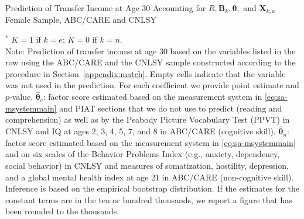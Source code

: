 \begin{table}
\begin{threeparttable}
\caption{Prediction of Transfer Income at Age 30 Accounting for $R, \bm{B}_k, \bm{\theta},$ and $\bm{X}_{k,a}$ Female Sample, ABC/CARE and CNLSY}
\label{table:end3}
\centering
\scriptsize

\begin{tablenotes}
\footnotesize
\item $^\ast$ $K=1$ if $k=e$; $K=0$ if $k=n$.\\ 
Note: Prediction of transfer income at age 30 based on the variables listed in the row using the ABC/CARE and the CNLSY sample constructed according to the procedure in Section~\ref{appendix:match}. Empty cells indicate that the variable was not used in the prediction. For each coefficient we provide point estimate and $p$-value. $\hat{\bm{\theta}}_{c}$: factor score estimated based on the measurement system in \eqref{eq:sa-msystemmain} and PIAT sections that we do not use to predict (reading and comprehension) as well as by the Peabody Picture Vocabulary Test (PPVT) in CNLSY and IQ at ages 2, 3, 4, 5, 7, and 8 in ABC/CARE (cognitive skill). $\hat{\bm{\theta}}_{n}$: factor score estimated based on the measurement system in \eqref{eq:sa-msystemmain} and on six scales of the Behavior Problems Index (e.g., anxiety, dependency, social behavior) in CNLSY and measures of somatization, hostility, depression, and a global mental health index at age 21 in ABC/CARE (non-cognitive skill). Inference is based on the empirical bootstrap distribution. If the estimates for the constant terms are in the ten or hundred thousands, we report a figure that has been rounded to the thousands.
\end{tablenotes}
\end{threeparttable}
\end{table}

